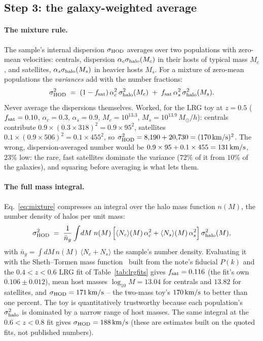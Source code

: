 \documentclass[11pt]{article}
\newcommand{\shod}{\sigma_{\rm HOD}}
\newcommand{\shalo}{\sigma_{\rm halo}}
\newcommand{\Msun}{M_\odot}
\newcommand{\kms}{\,{\rm km/s}}
\begin{document}
\subsection{Step 3: the galaxy-weighted average}
\label{sec:average}

\paragraph{The mixture rule.}
The sample's internal dispersion $\shod$ averages over two
populations with zero-mean velocities: centrals, dispersion
$\alpha_c\shalo(M_c)$ in their hosts of typical mass $M_c$, and
satellites, $\alpha_s\shalo(M_s)$ in heavier hosts $M_s$.  For a
mixture of zero-mean populations the \emph{variances} add with the
number fractions:
\begin{equation}
  \shod^2 \;=\; (1 - f_{\rm sat})\,\alpha_c^2\,\shalo^2(M_c)
  \;+\; f_{\rm sat}\,\alpha_s^2\,\shalo^2(M_s) .
  \label{eq:mixture}
\end{equation}
Never average the dispersions themselves.  Worked, for the LRG toy at
$z = 0.5$ ($f_{\rm sat} = 0.10$, $\alpha_c = 0.3$, $\alpha_s = 0.9$,
$M_c = 10^{13.3}$, $M_s = 10^{13.9}\,\Msun/h$): centrals contribute
$0.9 \times (0.3 \times 318)^2 = 0.9 \times 95^2$, satellites
$0.1 \times (0.9 \times 506)^2 = 0.1 \times 455^2$, so
$\shod^2 = 8{,}190 + 20{,}730 = (170\kms)^2$.  The wrong,
dispersion-averaged number would be
$0.9 \times 95 + 0.1 \times 455 = 131\kms$, $23\%$ low: the rare, fast
satellites dominate the variance ($72\%$ of it from $10\%$ of the
galaxies), and squaring before averaging is what lets them.

\paragraph{The full mass integral.}
Eq.~\eqref{eq:mixture} compresses an integral over the halo mass
function $n(M)$, the number density of halos per unit mass:
\begin{equation}
  \shod^2 \;=\; \frac{1}{\bar{n}_g}\int\! dM\; n(M)\,
  \Bigl[\langle N_c\rangle(M)\,\alpha_c^2
      + \langle N_s\rangle(M)\,\alpha_s^2\Bigr]\,\shalo^2(M) ,
  \label{eq:integral}
\end{equation}
with $\bar{n}_g = \int dM\, n(M)\,\langle N_c + N_s\rangle$ the
sample's number density.
Evaluating it with the Sheth--Tormen mass
function~\cite{ShethTormen1999} built from the note's fiducial $P(k)$
and the $0.4 < z < 0.6$ LRG fit of Table~\ref{tab:lrgfits} gives
$f_{\rm sat} = 0.116$ (the fit's own $0.106 \pm 0.012$),
mean host masses $\log_{10}M = 13.04$ for centrals and $13.82$ for
satellites, and $\shod = 171\kms$ -- the two-mass toy's $170\kms$ to
better than one percent.  The toy is quantitatively trustworthy
because each population's $\shalo^2$ is dominated by a narrow range of
host masses.  The same integral at the $0.6 < z < 0.8$ fit gives
$\shod = 188\kms$ (these are estimates built on the quoted fits, not
published numbers).
\end{document}

